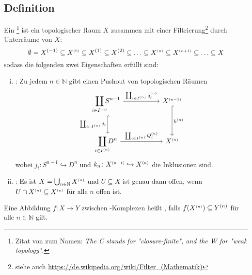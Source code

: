 \subsection[Definition: \CW-Komplex]{Definition} %
\label{sub:113}
Ein \footnote{Zitat von  zum Namen: \textenglish{\emph{The C stands for "closure-finite", and the W for "weak topology".}}} ist ein topologischer Raum $X$ zusammen mit einer Filtrierung\footnote{siehe auch \url{https://de.wikipedia.org/wiki/Filter_(Mathematik)}} durch Unterräume von $X$: 
\[
	\emptyset = X^{(-1)} \subseteq X^{{\scriptscriptstyle(0)}} \subseteq X^{(1)} \subseteq X^{(2)} \subseteq  \ldots \subseteq X^{\scriptscriptstyle(n)} \subseteq X^{\scriptscriptstyle(n+1)} \subseteq \ldots \subseteq X
\]
sodass die folgenden zwei Eigenschaften erfüllt sind:
\begin{enumerate}[(i)]
	\item {}: Zu jedem $n \in \mathds{N}$ gibt einen Pushout von topologischen Räumen 
	\[
		\begin{tikzcd}[row sep = large, column sep = 5.4em]
			\smashoperator{\coprod\limits_{i \in I^{(n)}}} S^{n-1} \rar["\coprod_{i \in I^{(n)}} q_i^\ssbrace{n}"] \dar["\coprod_{i \in I^{(n)}} j_i"', hook] 
			& X^\ssbrace{n-1} \dar[hook, "k^{(n)}"] \\
			\smashoperator{\coprod\limits_{i \in I^{(n)}}} D^n \rar["\coprod_{i \in I^{(n)}} Q_i^\ssbrace{n}"] & X^\ssbrace{n}
		\end{tikzcd}
	\]
	wobei $j_i \colon S^{n-1} \hookrightarrow D^n$ und $k_n \colon X^{\scriptscriptstyle(n-1)} \hookrightarrow X^{\scriptscriptstyle(n)}$ die Inklusionen sind.
	\item {}: Es ist $X= \bigcup_{n \in \mathbb{N}} X^{\scriptscriptstyle(n)}$ und $U \subseteq X$ ist genau dann offen, wenn $U \cap X^{\scriptscriptstyle(n)} \subseteq X^{\scriptscriptstyle(n)}$ für 
	alle $n$ offen ist.
\end{enumerate}
Eine Abbildung $f \colon X \to Y$ zwischen \CW-Komplexen heißt , falls $f\enbrace*{X^\ssbrace{n}}\subseteq Y^{(n)}$ für alle $n \in \mathds{N}$ gilt. 

